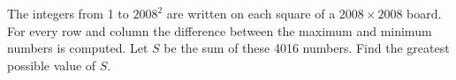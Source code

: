 The integers from 1 to $ 2008^2$ are written on each square of a $ 2008 \times 2008$ board. For every row and column the difference between the maximum and minimum numbers is computed. Let $ S$ be the sum of these 4016 numbers. Find the greatest possible value of $ S$.